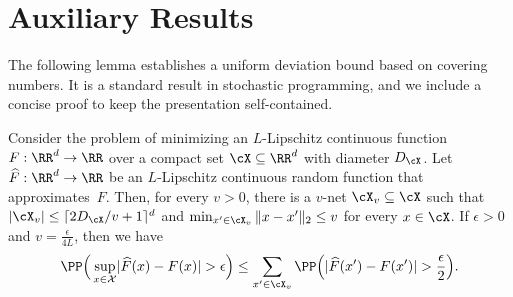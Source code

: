 \documentclass[11pt]{article}
\let\hat\widehat
\begin{document}
\section{Auxiliary Results} \label{appendix:auxiliary}
\renewcommand{\thelemma}{A.\arabic{lemma}}  
The following lemma establishes a uniform deviation bound based on covering numbers. It is a standard result in stochastic programming, and we include a concise proof to keep the presentation self-contained.

\begin{lemma}\label{lemma:v-net}
Consider the problem of minimizing an $L$-Lipschitz continuous function $F:\RR^d\to\RR$ over a compact set $\cX\subseteq\RR^d$ with diameter $D_{\cX}$. Let $\hat F:\RR^d\to\RR$ be an $L$-Lipschitz continuous random function that approximates~$F$. Then, for every $v>0$, there is a $v$-net $\cX_v\subseteq \cX$ such that $|\cX_v|\leq\lceil 2D_{\cX}/v+1\rceil^{d}$ and $\min_{x^\prime\in\cX_v}\|x-x^\prime\|_2\leq v$ for every $x\in\cX$. If $\epsilon>0$ and $v=\frac{\epsilon}{4L}$,  then we have
    \begin{align*} 
        \PP\Big(\sup_{x\in\mathcal{X}} \lvert \hat F(x) - F(x) \rvert > \epsilon \Big)\leq\sum_{x^\prime\in\cX_v} \PP\Big( \lvert  \hat F(x^\prime) - F(x^\prime) \rvert  > \frac{\epsilon}{2}\Big).
    \end{align*}
\end{lemma}
\end{document}
